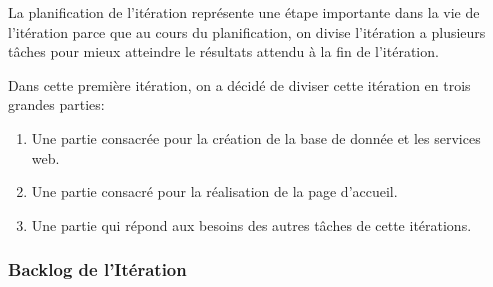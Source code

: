 La planification de l'itération représente une étape importante dans la vie de
l'itération parce que au cours du planification, on divise l'itération a
plusieurs tâches pour mieux atteindre le résultats attendu à la fin de
l'itération.

Dans cette première itération, on a décidé de diviser cette itération en trois
grandes parties:

\begin{enumerate}
    \item Une partie consacrée pour la création de la base de donnée et les
        services web.
 \item Une partie consacré pour la réalisation de la page d'accueil.
 \item Une partie qui répond aux besoins des autres tâches de cette itérations.
\end{enumerate}

\subsubsection{Backlog de l'Itération}

